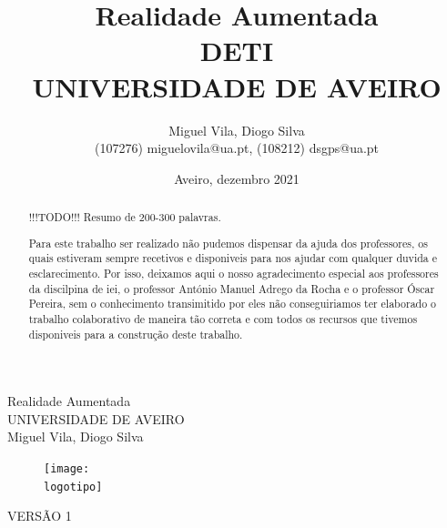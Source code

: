 \documentclass{report}
\begin{document}
\def\titulo{Realidade Aumentada}
\def\data{Aveiro, dezembro 2021}
\def\autores{Miguel Vila, Diogo Silva}
\def\autorescontactos{(107276) miguelovila@ua.pt, (108212) dsgps@ua.pt}
\def\versao{VERSÃO 1}
\def\departamento{DETI}
\def\empresa{UNIVERSIDADE DE AVEIRO}
\def\logotipo{ua.pdf}

\begin{titlepage}
\begin{center}
\vspace*{50mm}
{\Huge \titulo}\\ 
\vspace{10mm}
{\Large \empresa}\\
\vspace{10mm}
{\LARGE \autores}\\ 
\vspace{30mm}
\begin{figure}[h]
\center
\texttt{[image: \\logotipo]}
\end{figure}
\vspace{30mm}
\end{center}
\begin{flushright}
\versao
\end{flushright}
\end{titlepage}

\title{%
{\Huge\textbf{\titulo}}\\
{\Large \departamento\\ \empresa}
}
\author{
    \autores \\
    \autorescontactos
}
\date{\data}
\maketitle
{}

\begin{abstract}
!!!TODO!!! Resumo de 200-300 palavras.
\end{abstract}

\renewcommand{\abstractname}{Agradecimentos}
\begin{abstract}
Para este trabalho ser realizado não pudemos dispensar da ajuda dos professores, os quais estiveram sempre recetivos e disponiveis para nos ajudar com qualquer duvida e esclarecimento. Por isso, deixamos aqui o nosso agradecimento especial aos professores da discilpina de \ac{iei}, o professor António Manuel Adrego da Rocha e o professor Óscar Pereira, sem o conhecimento transimitido por eles não conseguiriamos ter elaborado o trabalho colaborativo de maneira tão correta e com todos os recursos que tivemos disponiveis para a construção deste trabalho.
\end{abstract}
\end{document}
